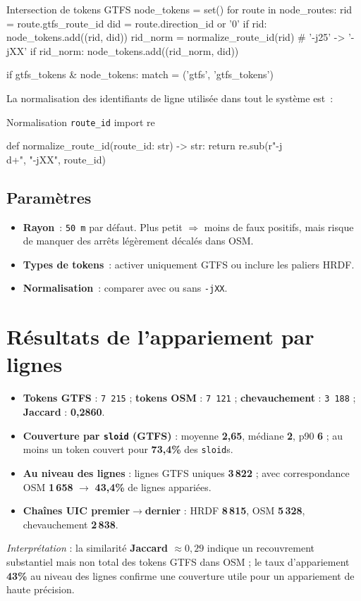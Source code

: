 \begin{codebox}[language=Python]{Intersection de tokens GTFS}
node_tokens = set()
for route in node_routes:
    rid = route.gtfs_route_id
    did = route.direction_id or '0'
    if rid:
        node_tokens.add((rid, did))
        rid_norm = normalize_route_id(rid)  # '-j25' -> '-jXX'
        if rid_norm:
            node_tokens.add((rid_norm, did))

if gtfs_tokens & node_tokens:
    match = ('gtfs', 'gtfs_tokens')
\end{codebox}

La normalisation des identifiants de ligne utilisée dans tout le système est :

\begin{codebox}[language=Python]{Normalisation \texttt{route\_id}}
import re

def normalize_route_id(route_id: str) -> str:
    return re.sub(r"-j\\d+", "-jXX", route_id)
\end{codebox}

\subsection{Paramètres}
\begin{itemize}
  \item \textbf{Rayon} : \texttt{50 m} par défaut. Plus petit $\Rightarrow$ moins de faux positifs, mais risque de manquer des arrêts légèrement décalés dans OSM.
  \item \textbf{Types de tokens} : activer uniquement GTFS ou inclure les paliers HRDF.
  \item \textbf{Normalisation} : comparer avec ou sans \texttt{-jXX}.
\end{itemize}

\section{Résultats de l'appariement par lignes}
\begin{itemize}
  \item \textbf{Tokens GTFS} : \texttt{7\,215} ; \textbf{tokens OSM} : \texttt{7\,121} ; \textbf{chevauchement} : \texttt{3\,188} ; \textbf{Jaccard} : \textbf{0,2860}.
  \item \textbf{Couverture par \texttt{sloid} (GTFS)} : moyenne \textbf{2,65}, médiane \textbf{2}, p90 \textbf{6} ; au moins un token couvert pour \textbf{73,4\%} des \texttt{sloid}s.
  \item \textbf{Au niveau des lignes} : lignes GTFS uniques \textbf{3\,822} ; avec correspondance OSM \textbf{1\,658} $\rightarrow$ \textbf{43,4\%} de lignes appariées.
  \item \textbf{Chaînes UIC premier$\rightarrow$dernier} : HRDF \textbf{8\,815}, OSM \textbf{5\,328}, chevauchement \textbf{2\,838}.
\end{itemize}
\noindent \emph{Interprétation} : la similarité \textbf{Jaccard $\approx 0{,}29$} indique un recouvrement substantiel mais non total des tokens GTFS dans OSM ; le taux d'appariement \textbf{43\%} au niveau des lignes confirme une couverture utile pour un appariement de haute précision.

